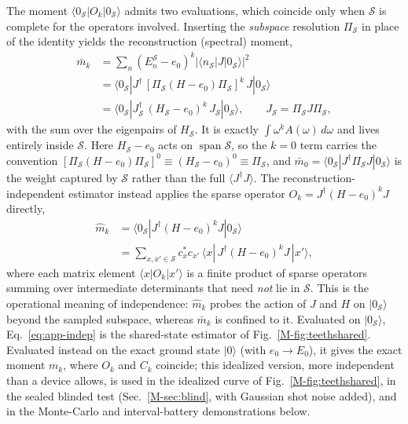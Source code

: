 \documentclass[aps,prb,onecolumn,superscriptaddress,longbibliography,floatfix]{revtex4-2}
\begin{document}
The moment $\langle 0_\mathcal{S}|O_k|0_\mathcal{S}\rangle$ admits two evaluations, which coincide only when $\mathcal{S}$ is complete for the operators involved. Inserting the \emph{subspace} resolution $\Pi_\mathcal{S}$ in place of the identity yields the reconstruction (spectral) moment,
\begin{equation}
\begin{aligned}
\bar m_k&=\sum_{n}(E_n^{\mathcal{S}}-e_0)^k|\langle n_{\mathcal{S}}|J|0_\mathcal{S}\rangle|^2\\
&=\langle 0_\mathcal{S}|J^\dagger\,[\Pi_\mathcal{S}(H-e_0)\Pi_\mathcal{S}]^{k}\,J|0_\mathcal{S}\rangle\\
&=\langle 0_\mathcal{S}|J_\mathcal{S}^\dagger\,(H_\mathcal{S}-e_0)^{k}\,J_\mathcal{S}|0_\mathcal{S}\rangle,\qquad J_\mathcal{S}=\Pi_\mathcal{S}J\Pi_\mathcal{S},
\end{aligned}
\label{eq:app-recon}
\end{equation}
with the sum over the eigenpairs of $H_\mathcal{S}$. It is exactly $\int\omega^k A(\omega)\,d\omega$ and lives entirely inside $\mathcal{S}$. Here $H_\mathcal{S}-e_0$ acts on $\operatorname{span}\mathcal{S}$, so the $k=0$ term carries the convention $[\Pi_\mathcal{S}(H-e_0)\Pi_\mathcal{S}]^{0}\equiv(H_\mathcal{S}-e_0)^0\equiv\Pi_\mathcal{S}$, and ${\bar m_0=\langle 0_\mathcal{S}|J^\dagger\Pi_\mathcal{S}J|0_\mathcal{S}\rangle}$ is the weight captured by $\mathcal{S}$ rather than the full $\langle J^\dagger J\rangle$. The reconstruction-independent estimator instead applies the sparse operator $O_k=J^\dagger(H-e_0)^kJ$ directly,
\begin{equation}
\begin{aligned}
\widehat{m}_k&=\langle 0_\mathcal{S}|J^\dagger(H-e_0)^kJ|0_\mathcal{S}\rangle\\
&=\sum_{x,x'\in\mathcal{S}}c_x^{*}c_{x'}\,\langle x|\,J^\dagger(H-e_0)^kJ\,|x'\rangle,
\end{aligned}
\label{eq:app-indep}
\end{equation}
where each matrix element $\langle x|O_k|x'\rangle$ is a finite product of sparse operators summing over intermediate determinants that need \emph{not} lie in $\mathcal{S}$. This is the operational meaning of independence: $\widehat{m}_k$ probes the action of $J$ and $H$ on $|0_\mathcal{S}\rangle$ beyond the sampled subspace, whereas $\bar m_k$ is confined to it. Evaluated on $|0_\mathcal{S}\rangle$, Eq.~\eqref{eq:app-indep} is the shared-state estimator of Fig.~\ref{M-fig:teethshared}. Evaluated instead on the exact ground state $|0\rangle$ (with $e_0\to E_0$), it gives the exact moment $m_k$, where $O_k$ and $C_k$ coincide; this idealized version, more independent than a device allows, is used in the idealized curve of Fig.~\ref{M-fig:teethshared}, in the sealed blinded test (Sec.~\ref{M-sec:blind}, with Gaussian shot noise added), and in the Monte-Carlo and interval-battery demonstrations below.
\end{document}
